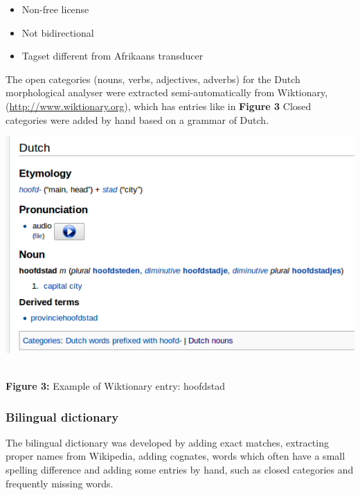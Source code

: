 \documentclass[a0,landscape]{a0poster}
\begin{document}
\begin{multicols}{4}
\begin{itemize}
 \item Non-free license
 \item Not bidirectional
 \item Tagset different from Afrikaans transducer
\end{itemize}

\vspace{0.5cm}

\noindent
The open categories (nouns, verbs, adjectives, adverbs) for the Dutch 
morphological analyser were extracted semi-automatically from 
Wiktionary, (\url{http://www.wiktionary.org}), which has entries like in {\bf Figure 3}
Closed categories were added by hand based on a grammar of Dutch.
\vspace{0.5cm}

\begin{center}
\begin{minipage}[b]{26cm}
\includegraphics[width=260mm]{hoofdstad.png}
\end{minipage}\\
\textbf{Figure 3:} Example of Wiktionary entry: hoofdstad
\label{wikt1}
\vspace{0.3cm}
\end{center}


\vspace{0.5cm}

\subsubsection{Bilingual dictionary}

\noindent
The bilingual dictionary was developed by adding exact matches, extracting proper names
from Wikipedia, adding cognates, words which often have a small spelling difference and adding
some entries by hand, such as closed categories and frequently missing words.


\end{multicols}
\end{document}
